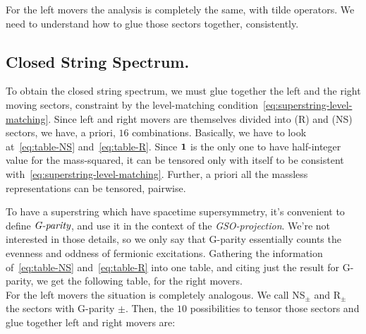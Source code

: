 For the left movers the analysis is completely the same, with tilde operators. We need to understand how to glue those sectors together, consistently.

\subsection{Closed String Spectrum.}
To obtain the closed string spectrum, we must glue together the left and the right moving sectors, constraint by the level-matching condition~\eqref{eq:superstring-level-matching}. Since left and right movers are themselves divided into (R) and (NS) sectors, we have, a priori, $16$ combinations. Basically, we have to look at~\eqref{eq:table-NS} and~\eqref{eq:table-R}. Since $\boldsymbol{1}$ is the only one to have half-integer value for the mass-squared, it can be tensored only with itself to be consistent with~\eqref{eq:superstring-level-matching}. Further, a priori all the massless representations can be tensored, pairwise.

To have a superstring which have spacetime supersymmetry, it's convenient to define $\emph{G-parity}$, and use it in the context of the \emph{GSO-projection}. We're not interested in those details, so we only say that G-parity essentially counts the evenness and oddness of fermionic excitations. Gathering the information of~\eqref{eq:table-NS} and~\eqref{eq:table-R} into one table, and citing just the result for G-parity, we get the following table, for the right movers.
\begin{equation*}
    
\end{equation*}
For the left movers the situation is completely analogous. We call NS$_\pm$ and R$_\pm$ the sectors with G-parity $\pm$. Then, the $10$ possibilities to tensor those sectors and glue together left and right movers are:
\begin{equation*}
    
\end{equation*}

